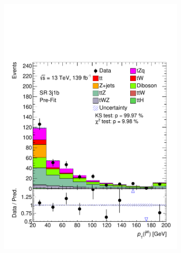\begin{figure}[!h]
\begin{subfigure}[b]{0.33\linewidth}
    \includegraphics[width=\linewidth]{ubonn-thesis/Chapters/Chapters_06/Figure/Input_distribution/SR_3j1b_lepW_pt.pdf} 
  \end{subfigure} 
  \newline
  \begin{subfigure}[b]{0.33\linewidth}
    \centering

\end{subfigure}
\end{figure}
